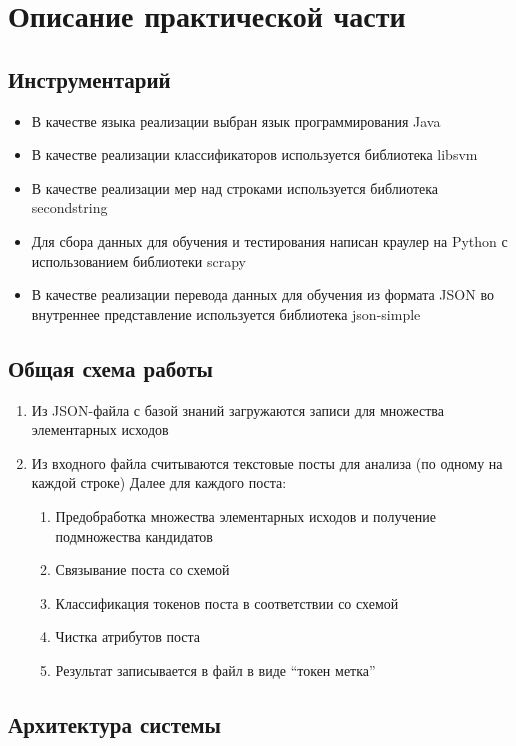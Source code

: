 \chapter{Описание практической части}


\section{Инструментарий}

\begin{itemize}
	\item В качестве языка реализации выбран язык программирования Java
	\item В качестве реализации классификаторов используется библиотека libsvm
	\item В качестве реализации мер над строками используется библиотека secondstring
	\item Для сбора данных для обучения и тестирования написан краулер на Python с использованием библиотеки scrapy
	\item В качестве реализации перевода данных для обучения из формата JSON во внутреннее представление используется библиотека json-simple
\end{itemize}


\section{Общая схема работы}

\begin{enumerate}
	\item Из JSON-файла с базой знаний загружаются записи для множества элементарных исходов
	\item Из входного файла считываются текстовые посты для анализа (по одному на каждой строке) Далее для каждого поста:
	\begin{enumerate}
		\item Предобработка множества элементарных исходов и получение подмножества кандидатов
		\item Связывание поста со схемой
		\item Классификация токенов поста в соответствии со схемой
		\item Чистка атрибутов поста
		\item Результат записывается в файл в виде ``токен метка'' 
	\end{enumerate}
\end{enumerate}


\section{Архитектура системы}

